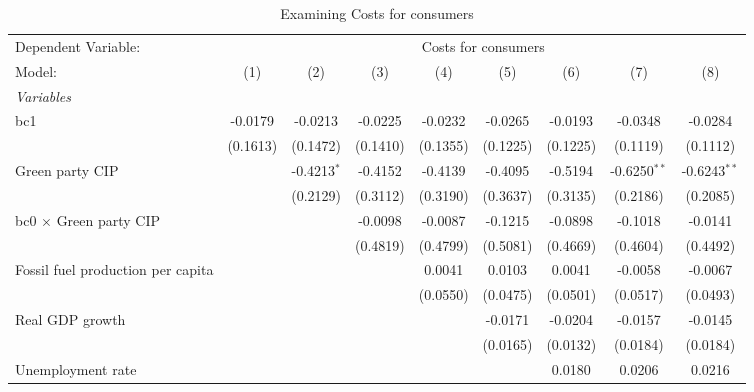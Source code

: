 
\begin{table}[htbp]
   \caption{Examining Costs for consumers}
   \centering
   \begin{tabular}{lcccccccc}
      \tabularnewline \midrule \midrule
      Dependent Variable: & \multicolumn{8}{c}{Costs for consumers}\\
      Model:                                  & (1)      & (2)           & (3)      & (4)      & (5)      & (6)      & (7)            & (8)\\  
      \midrule
      \emph{Variables}\\
      bc1                                     & -0.0179  & -0.0213       & -0.0225  & -0.0232  & -0.0265  & -0.0193  & -0.0348        & -0.0284\\   
                                              & (0.1613) & (0.1472)      & (0.1410) & (0.1355) & (0.1225) & (0.1225) & (0.1119)       & (0.1112)\\   
      Green party CIP                         &          & -0.4213$^{*}$ & -0.4152  & -0.4139  & -0.4095  & -0.5194  & -0.6250$^{**}$ & -0.6243$^{**}$\\   
                                              &          & (0.2129)      & (0.3112) & (0.3190) & (0.3637) & (0.3135) & (0.2186)       & (0.2085)\\   
      bc0 $\times$ Green party CIP            &          &               & -0.0098  & -0.0087  & -0.1215  & -0.0898  & -0.1018        & -0.0141\\   
                                              &          &               & (0.4819) & (0.4799) & (0.5081) & (0.4669) & (0.4604)       & (0.4492)\\   
      Fossil fuel production per capita       &          &               &          & 0.0041   & 0.0103   & 0.0041   & -0.0058        & -0.0067\\   
                                              &          &               &          & (0.0550) & (0.0475) & (0.0501) & (0.0517)       & (0.0493)\\   
      Real GDP growth                         &          &               &          &          & -0.0171  & -0.0204  & -0.0157        & -0.0145\\   
                                              &          &               &          &          & (0.0165) & (0.0132) & (0.0184)       & (0.0184)\\   
      Unemployment rate                       &          &               &          &          &          & 0.0180   & 0.0206         & 0.0216\\   

\end{tabular}
\end{table}
